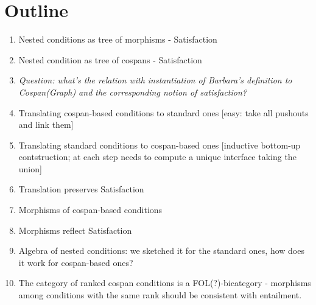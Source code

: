 \section{Outline}

\begin{enumerate}
\item  Nested conditions as tree of morphisms - Satisfaction 
\item  Nested condition as tree of cospans - Satisfaction
\item \emph{Question: what's the relation with instantiation of Barbara's definition to Cospan(Graph) and the corresponding notion of satisfaction?}
\item  Translating cospan-based conditions to standard ones [easy: take all pushouts and link them]
\item  Translating standard conditions to cospan-based ones [inductive bottom-up contstruction; at each step needs to compute a unique interface taking the union]
\item Translation preserves Satisfaction
\item  Morphisms of cospan-based conditions
\item  Morphisms reflect Satisfaction
\item Algebra of nested conditions: we sketched it for the standard ones, how does it work for cospan-based ones?
\item The category of ranked cospan conditions is a FOL(?)-bicategory - morphisms among conditions with the same rank should be consistent with entailment.
\end{enumerate}
